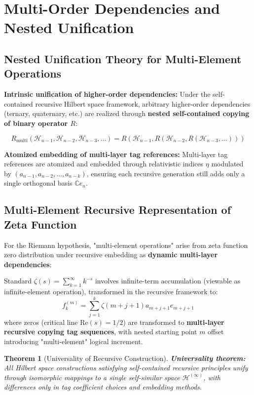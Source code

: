 \documentclass[12pt]{article}
\theoremstyle{plain}
\newtheorem{theorem}{Theorem}[section]
\theoremstyle{definition}
\begin{document}
\section{Multi-Order Dependencies and Nested Unification}

\subsection{Nested Unification Theory for Multi-Element Operations}

\textbf{Intrinsic unification of higher-order dependencies:} Under the self-contained recursive Hilbert space framework, arbitrary higher-order dependencies (ternary, quaternary, etc.) are realized through \textbf{nested self-contained copying of binary operator $R$}:

$$R_{\text{multi}}(\mathcal{H}_{n-1}, \mathcal{H}_{n-2}, \mathcal{H}_{n-3}, \ldots) = R(\mathcal{H}_{n-1}, R(\mathcal{H}_{n-2}, R(\mathcal{H}_{n-3}, \ldots)))$$

\textbf{Atomized embedding of multi-layer tag references:} Multi-layer tag references are atomized and embedded through relativistic indices $\eta$ modulated by $(a_{n-1}, a_{n-2}, \ldots, a_{n-k})$, ensuring each recursive generation still adds only a single orthogonal basis $\mathbb{C} e_n$.

\subsection{Multi-Element Recursive Representation of Zeta Function}

For the Riemann hypothesis, "multi-element operations" arise from zeta function zero distribution under recursive embedding as \textbf{dynamic multi-layer dependencies}:

Standard $\zeta(s) = \sum_{k=1}^\infty k^{-s}$ involves infinite-term accumulation (viewable as infinite-element operation), transformed in the recursive framework to:
$$f_k^{(m)} = \sum_{j=1}^k \zeta(m+j+1) a_{m+j+1} e_{m+j+1}$$
where zeros (critical line $\text{Re}(s)=1/2$) are transformed to \textbf{multi-layer recursive copying tag sequences}, with nested starting point $m$ offset introducing "multi-element" logical increment.

\begin{theorem}[Universality of Recursive Construction]
\textbf{Universality theorem:} All Hilbert space constructions satisfying self-contained recursive principles unify through isomorphic mappings to a single self-similar space $\mathcal{H}^{(\infty)}$, with differences only in tag coefficient choices and embedding methods.
\end{theorem}
\end{document}
